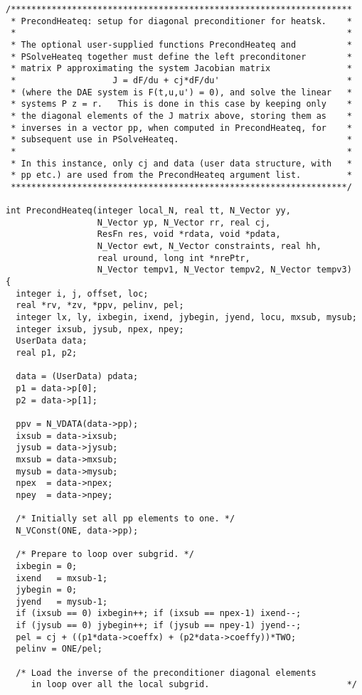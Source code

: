 \begin{verbatim}
/*******************************************************************
 * PrecondHeateq: setup for diagonal preconditioner for heatsk.    *
 *                                                                 *
 * The optional user-supplied functions PrecondHeateq and          *
 * PSolveHeateq together must define the left preconditoner        *
 * matrix P approximating the system Jacobian matrix               *
 *                   J = dF/du + cj*dF/du'                         *
 * (where the DAE system is F(t,u,u') = 0), and solve the linear   *
 * systems P z = r.   This is done in this case by keeping only    *
 * the diagonal elements of the J matrix above, storing them as    *
 * inverses in a vector pp, when computed in PrecondHeateq, for    *
 * subsequent use in PSolveHeateq.                                 *
 *                                                                 *
 * In this instance, only cj and data (user data structure, with   * 
 * pp etc.) are used from the PrecondHeateq argument list.         *
 ******************************************************************/
  
int PrecondHeateq(integer local_N, real tt, N_Vector yy,
                  N_Vector yp, N_Vector rr, real cj,
                  ResFn res, void *rdata, void *pdata,
                  N_Vector ewt, N_Vector constraints, real hh, 
                  real uround, long int *nrePtr,
                  N_Vector tempv1, N_Vector tempv2, N_Vector tempv3)
{
  integer i, j, offset, loc;
  real *rv, *zv, *ppv, pelinv, pel;
  integer lx, ly, ixbegin, ixend, jybegin, jyend, locu, mxsub, mysub;
  integer ixsub, jysub, npex, npey;
  UserData data;
  real p1, p2;

  data = (UserData) pdata;
  p1 = data->p[0];
  p2 = data->p[1];

  ppv = N_VDATA(data->pp);
  ixsub = data->ixsub;
  jysub = data->jysub;
  mxsub = data->mxsub;
  mysub = data->mysub;
  npex  = data->npex;
  npey  = data->npey;
  
  /* Initially set all pp elements to one. */
  N_VConst(ONE, data->pp);

  /* Prepare to loop over subgrid. */
  ixbegin = 0;
  ixend   = mxsub-1;
  jybegin = 0;
  jyend   = mysub-1;
  if (ixsub == 0) ixbegin++; if (ixsub == npex-1) ixend--;
  if (jysub == 0) jybegin++; if (jysub == npey-1) jyend--;
  pel = cj + ((p1*data->coeffx) + (p2*data->coeffy))*TWO;
  pelinv = ONE/pel;

  /* Load the inverse of the preconditioner diagonal elements
     in loop over all the local subgrid.                           */


\end{verbatim}
